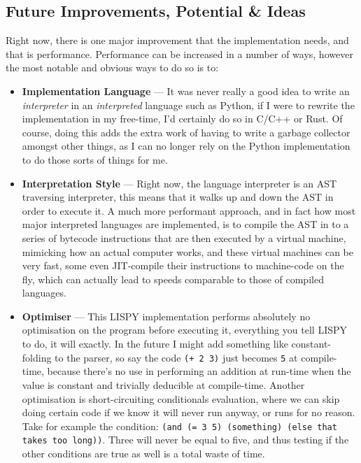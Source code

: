 \documentclass{article}
\newcommand{\code}[1]{\texttt{#1}}
\begin{document}
  \subsection{Future Improvements, Potential \& Ideas}
    Right now, there is one major improvement that the implementation needs,
    and that is performance.  Performance can be increased in a number of ways,
    however the most notable and obvious ways to do so is to:
    \begin{itemize}
      \item \textbf{Implementation Language} --- It was never really a good idea
      to write an \emph{interpreter} in an \emph{interpreted} language such as
      Python, if I were to rewrite the implementation in my free-time, I'd
      certainly do so in C/C++ or Rust. Of course, doing this adds the extra work
      of having to write a garbage collector amongst other things, as I can no
      longer rely on the Python implementation to do those sorts of things
      for me.
      \item \textbf{Interpretation Style} --- Right now, the language interpreter
      is an AST traversing interpreter, this means that it walks up and down
      the AST in order to execute it. A much more performant approach,
      and in fact how most major interpreted languages are implemented, is to
      compile the AST in to a series of bytecode instructions that are then
      executed by a virtual machine, mimicking how an actual computer works,
      and these virtual machines can be very fast, some even JIT-compile their
      instructions to machine-code on the fly, which can actually lead to speeds
      comparable to those of compiled languages.
      \item \textbf{Optimiser} --- This LISPY implementation performs absolutely
      no optimisation on the program before executing it, everything you tell
      LISPY to do, it will exactly.  In the future I might add something like
      constant-folding to the parser, so say the code \code{(+ 2 3)} just becomes
      \code{5} at compile-time, because there's no use in performing an addition
      at run-time when the value is constant and trivially deducible at compile-time.
      Another optimisation is short-circuiting conditionals evaluation, where
      we can skip doing certain code if we know it will never run anyway, or runs
      for no reason. Take for example the condition:
      \code{(and (= 3 5) (something) (else that takes too long))}.
      Three will never be equal to five, and thus testing if the other
      conditions are true as well is a total waste of time.
    \end{itemize}
\end{document}
